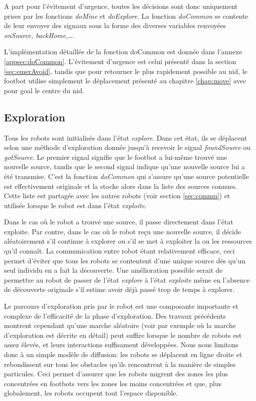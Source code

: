 A part pour l'évitement d'urgence, toutes les décisions sont donc uniquement prises par les fonctions \emph{doMine} et \emph{doExplore}. La fonction \emph{doCommon} se contente de leur envoyer des signaux sous la forme des diverses variables renvoyées \emph{onSource, backHome,\ldots}.

L'implémentation détaillée de la fonction doCommon est donnée dans l'annexe \ref{appsec:doCommon}. L'évitement d'urgence est celui présenté dans la section \ref{sec:emerAvoid}, tandis que pour retourner le plus rapidement possible au nid, le footbot utilise simplement le déplacement présenté au chapitre \ref{chap:move} avec pour goal le centre du nid.

\subsection{Exploration\label{sec:explore}}

Tous les robots sont initialisés dans l'état \emph{explore}. Dans cet état, ils se déplacent selon une méthode d'exploration donnée jusqu'à recevoir le signal \emph{foundSource} ou \emph{gotSource}. Le premier signal signifie que le footbot a lui-même trouvé une nouvelle source, tandis que le second signal indique qu'une nouvelle source lui a été transmise. C'est la fonction \emph{doCommon} qui s'assure qu'une source potentielle est effectivement originale et la stocke alors dans la liste des sources connues. Cette liste est partagée avec les autres robots (voir section \ref{sec:commu}) et utilisée lorsque le robot est dans l'état \emph{exploite}.

Dans le cas où le robot a trouvé une source, il passe directement dans l'état exploite. Par contre, dans le cas où le robot reçu une nouvelle source, il décide aléatoirement s'il continue à explorer ou s'il se met à exploiter la ou les ressources qu'il connaît. La communication entre robot étant relativement efficace, ceci permet d'éviter que tous les robots se contentent d'une unique source dès qu'un seul individu en a fait la découverte. Une amélioration possible serait de permettre au robot de passer de l'état \emph{explore} à l'état \emph{exploite} même en l'absence de découverte originale s'il estime avoir déjà passé trop de temps à explorer.

Le parcours d'exploration pris par le robot est une composante importante et complexe de l'efficacité de la phase d'exploration. Des travaux précédents montrent cependant qu'une marche aléatoire (voir \cite{foraging} par exemple où la marche d'exploration est décrite en détail) peut suffire lorsque le nombre de robots est assez élevés, et leurs interactions suffisament développées. Nous nous limitons donc à un simple modèle de diffusion: les robots se déplacent en ligne droite et rebondissent sur tous les obstacles qu'ils rencontrent à la manière de simples particules. Ceci permet d'assurer que les robots migrent des zones les plus concentrées en footbots vers les zones les moins concentrées et que, plus globalement, les robots occupent tout l'espace disponible.

